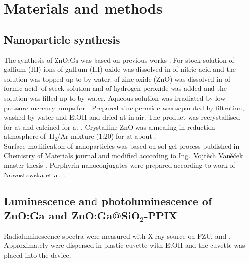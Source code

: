 
\section{Materials and methods}
\label{s:materials}

    \subsection{Nanoparticle synthesis}
    
        The synthesis of ZnO:Ga was based on previous works \cite{Prochazkova2015,Vanecek2017}. 
        For stock solution of gallium (III) ions  of gallium (III) oxide was dissolved in  of nitric acid and the solution was topped up to  by water. 
         of zinc oxide (ZnO) was dissolved in  of formic acid,  of stock solution and  of hydrogen peroxide was added and the solution was filled up to  by water. Aqueous solution was irradiated by low-pressure mercury lamps for . 
        Prepared zinc peroxide was separated by filtration, washed by water and EtOH and dried at  in air. The product was recrystallised for  at  and calcined for  at . Crystalline ZnO was annealing in reduction atmosphere of~H$_{2}$/Ar mixture (1:20) for  at about .\\
     
        Surface modification of nanoparticles was based on sol-gel process published in Chemistry of Materials journal \cite{Liu1998} and modified according to Ing.~Vojtěch Vaněček master thesis \cite{Vanecek2017}. Porphyrin nanoconjugates were prepared according to work of Nowostawska et al. \cite{nowostawska11}.

    \subsection{Luminescence and photoluminescence of ZnO:Ga and ZnO:Ga@SiO$_{2}$-PPIX} \label{sec:character_zno}
    
    Radioluminescence spectra were measured with \mbox{X-ray} source on FZU,  and . Approximately  were dispersed in plastic cuvette with EtOH and the cuvette was placed into the device.
    
